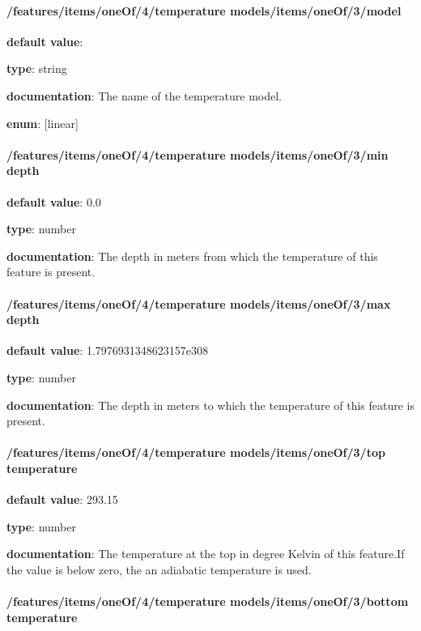 \paragraph{/features/items/oneOf/4/temperature models/items/oneOf/3/model} \begin{itemized}
\item {\bf default value}: 
\item {\bf type}: string
\item {\bf documentation}: The name of the temperature model.
\item {\bf enum}: [linear]\end{itemized}\paragraph{/features/items/oneOf/4/temperature models/items/oneOf/3/min depth} \begin{itemized}
\item {\bf default value}: 0.0
\item {\bf type}: number
\item {\bf documentation}: The depth in meters from which the temperature of this feature is present.
\end{itemized}\paragraph{/features/items/oneOf/4/temperature models/items/oneOf/3/max depth} \begin{itemized}
\item {\bf default value}: 1.7976931348623157e308
\item {\bf type}: number
\item {\bf documentation}: The depth in meters to which the temperature of this feature is present.
\end{itemized}\paragraph{/features/items/oneOf/4/temperature models/items/oneOf/3/top temperature} \begin{itemized}
\item {\bf default value}: 293.15
\item {\bf type}: number
\item {\bf documentation}: The temperature at the top in degree Kelvin of this feature.If the value is below zero, the an adiabatic temperature is used.
\end{itemized}\paragraph{/features/items/oneOf/4/temperature models/items/oneOf/3/bottom temperature} \begin{itemized}

\end{itemized}

